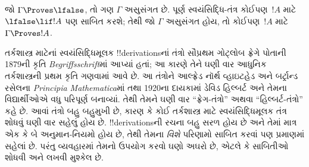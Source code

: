 \documentclass[../../../include/open-logic-section]{subfiles}
\begin{document}
જો $\Gamma \Proves \lfalse$, તો ગણ $\Gamma$ અસુસંગત છે. પૂર્ણ
સ્વયંસિદ્ધિ-તંત્ર કોઈપણ~$!A$ માટે $\lfalse \lif !A$ પણ સાબિત કરશે;
તેથી જો $\Gamma$ અસુસંગત હોય, તો કોઈપણ~$!A$ માટે
$\Gamma \Proves !A$.

તર્કશાસ્ત્ર માટેનાં સ્વયંસિદ્ધિમૂલક !!{derivation}sનાં તંત્રો સૌપ્રથમ
ગોટ્લોબ ફ્રેગે પોતાની 1879ની કૃતિ \emph{Begriffsschrift}માં આપ્યાં
હતાં; આ કારણે તેને ઘણી વાર આધુનિક તર્કશાસ્ત્રની પ્રથમ કૃતિ ગણવામાં
આવે છે. આ તંત્રોને આલ્ફ્રેડ નૉર્થ વ્હાઇટહેડ અને બર્ટ્રાન્ડ રસેલના
\emph{Principia Mathematica}માં તથા 1920ના દાયકામાં ડેવિડ હિલ્બર્ટ અને
તેમના વિદ્યાર્થીઓએ વધુ પરિપૂર્ણ બનાવ્યાં. તેથી તેમને ઘણી વાર
``ફ્રેગ-તંત્રો'' અથવા ``હિલ્બર્ટ-તંત્રો'' કહે છે. આવાં તંત્રો બહુ
બહુમુખી છે, કારણ કે કોઈ તર્કશાસ્ત્ર માટે સ્વયંસિદ્ધિમૂલક તંત્ર શોધવું
ઘણી વાર સહેલું હોય છે. !!{derivation}sની રચના બહુ સરળ હોય છે અને તેમાં
માત્ર એક કે બે અનુમાન-નિયમો હોય છે, તેથી તેમના \emph{વિશે} પરિણામો
સાબિત કરવાં પણ પ્રમાણમાં સહેલાં છે. પરંતુ વ્યવહારમાં તેમનો ઉપયોગ કરવો
ઘણો અઘરો છે, એટલે કે સાબિતીઓ શોધવી અને લખવી મુશ્કેલ છે.
\end{document}

